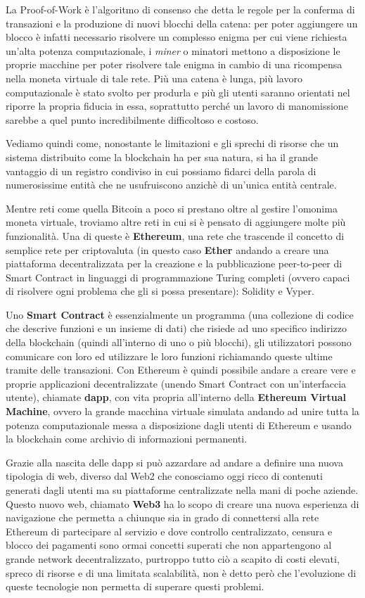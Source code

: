 La Proof-of-Work è l'algoritmo di consenso che detta le regole per 
la conferma di transazioni e la produzione di nuovi blocchi della catena: 
per poter aggiungere un blocco è infatti necessario risolvere un complesso 
enigma per cui viene richiesta un'alta potenza computazionale, i \emph{miner} 
o minatori mettono a disposizione le proprie macchine per poter risolvere tale 
enigma in cambio di una ricompensa nella moneta virtuale di tale rete.
Più una catena è lunga, più lavoro computazionale è stato svolto per produrla e 
più gli utenti saranno orientati nel riporre la propria fiducia in essa, soprattutto 
perché un lavoro di manomissione sarebbe a quel punto incredibilmente difficoltoso e costoso.

Vediamo quindi come, nonostante le limitazioni e gli sprechi di risorse che un sistema 
distribuito come la blockchain ha per sua natura, si ha il grande vantaggio 
di un registro condiviso in cui possiamo fidarci della parola di numerosissime 
entità che ne usufruiscono anzichè di un'unica entità centrale.

\label{sub:eth}
Mentre reti come quella Bitcoin a poco si prestano oltre al gestire l'omonima moneta virtuale, 
troviamo altre reti in cui si è pensato di aggiungere molte più funzionalità.
Una di queste è \textbf{Ethereum}, una rete che trascende il concetto di semplice rete 
per criptovaluta (in questo caso \textbf{Ether} andando a creare una piattaforma 
decentralizzata per la creazione e la pubblicazione peer-to-peer di Smart Contract 
in linguaggi di programmazione Turing completi (ovvero capaci di risolvere ogni problema 
che gli si possa presentare): Solidity e Vyper. 

Uno \textbf{Smart Contract} è essenzialmente un programma (una collezione di codice che descrive 
funzioni e un insieme di dati) che risiede ad uno specifico indirizzo della blockchain 
(quindi all'interno di uno o più blocchi), gli utilizzatori possono comunicare con loro 
ed utilizzare le loro funzioni richiamando queste ultime tramite delle transazioni. 
Con Ethereum è quindi possibile andare a creare vere e proprie applicazioni decentralizzate
(unendo Smart Contract con un'interfaccia utente), chiamate \textbf{dapp},
con vita propria all'interno della \textbf{Ethereum Virtual Machine}, ovvero
la grande macchina virtuale simulata andando ad unire tutta la potenza computazionale
messa a disposizione dagli utenti di Ethereum e usando la blockchain come archivio
di informazioni permanenti. 

Grazie alla nascita delle dapp si può azzardare ad andare a definire una nuova
tipologia di web, diverso dal Web2 che conosciamo oggi ricco di contenuti generati
dagli utenti ma su piattaforme centralizzate nella mani di poche aziende.
Questo nuovo web, chiamato \textbf{Web3} ha lo scopo di creare una nuova
esperienza di navigazione che permetta a chiunque sia in grado di connettersi
alla rete Ethereum di partecipare al servizio e dove controllo centralizzato,
censura e blocco dei pagamenti sono ormai concetti superati che non appartengono
al grande network decentralizzato, purtroppo tutto ciò a scapito di costi elevati,
spreco di risorse e di una limitata scalabilità, non è detto però che l'evoluzione
di queste tecnologie non permetta di superare questi problemi.

